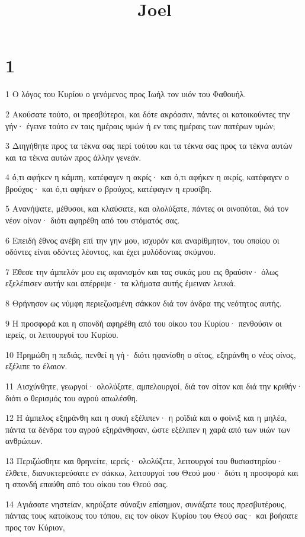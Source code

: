 

\title{Joel}


\chapter{1}

\par 1 Ο λόγος του Κυρίου ο γενόμενος προς Ιωήλ τον υιόν του Φαθουήλ.
\par 2 Ακούσατε τούτο, οι πρεσβύτεροι, και δότε ακρόασιν, πάντες οι κατοικούντες την γήν· έγεινε τούτο εν ταις ημέραις υμών ή εν ταις ημέραις των πατέρων υμών;
\par 3 Διηγήθητε προς τα τέκνα σας περί τούτου και τα τέκνα σας προς τα τέκνα αυτών και τα τέκνα αυτών προς άλλην γενεάν.
\par 4 ό,τι αφήκεν η κάμπη, κατέφαγεν η ακρίς· και ό,τι αφήκεν η ακρίς, κατέφαγεν ο βρούχος· και ό,τι αφήκεν ο βρούχος, κατέφαγεν η ερυσίβη.
\par 5 Ανανήψατε, μέθυσοι, και κλαύσατε, και ολολύξατε, πάντες οι οινοπόται, διά τον νέον οίνον· διότι αφηρέθη από του στόματός σας.
\par 6 Επειδή έθνος ανέβη επί την γην μου, ισχυρόν και αναρίθμητον, του οποίου οι οδόντες είναι οδόντες λέοντος, και έχει μυλόδοντας σκύμνου.
\par 7 Έθεσε την άμπελόν μου εις αφανισμόν και τας συκάς μου εις θραύσιν· όλως εξελέπισεν αυτήν και απέρριψε· τα κλήματα αυτής έμειναν λευκά.
\par 8 Θρήνησον ως νύμφη περιεζωσμένη σάκκον διά τον άνδρα της νεότητος αυτής.
\par 9 Η προσφορά και η σπονδή αφηρέθη από του οίκου του Κυρίου· πενθούσιν οι ιερείς, οι λειτουργοί του Κυρίου.
\par 10 Ηρημώθη η πεδιάς, πενθεί η γή· διότι ηφανίσθη ο σίτος, εξηράνθη ο νέος οίνος, εξέλιπε το έλαιον.
\par 11 Αισχύνθητε, γεωργοί· ολολύξατε, αμπελουργοί, διά τον σίτον και διά την κριθήν· διότι ο θερισμός του αγρού απωλέσθη.
\par 12 Η άμπελος εξηράνθη και η συκή εξέλιπεν· η ροϊδιά και ο φοίνιξ και η μηλέα, πάντα τα δένδρα του αγρού εξηράνθησαν, ώστε εξέλιπεν η χαρά από των υιών των ανθρώπων.
\par 13 Περιζώσθητε και θρηνείτε, ιερείς· ολολύζετε, λειτουργοί του θυσιαστηρίου· έλθετε, διανυκτερεύσατε εν σάκκω, λειτουργοί του Θεού μου· διότι η προσφορά και η σπονδή επαύθη από του οίκου του Θεού σας.
\par 14 Αγιάσατε νηστείαν, κηρύξατε σύναξιν επίσημον, συνάξατε τους πρεσβυτέρους, πάντας τους κατοίκους του τόπου, εις τον οίκον Κυρίου του Θεού σας· και βοήσατε προς τον Κύριον,
